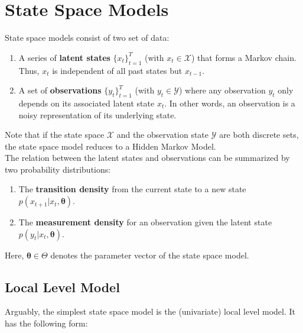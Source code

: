 \documentclass[11pt, oneside]{scrreprt}   	%
\begin{document}
\chapter{State Space Models}
\label{chp:models}
State space models consist of two set of data:
\begin{enumerate}
	\item A series of \textbf{latent states} $\{x_t\}_{t=1}^T$ (with $x_t \in \mathcal{X}$) that forms a Markov chain. Thus, $x_t$ is independent of all past states but $x_{t-1}$.
	\item A set of \textbf{observations} $\{y_t\}_{t=1}^T$ (with $y_t \in \mathcal{Y}$) where any observation $y_t$ only depends on its associated latent state $x_t$. In other words, an observation is a noisy representation of its underlying state.
\end{enumerate}
Note that if the state space $\mathcal{X}$ and the observation state $\mathcal{Y}$ are both discrete sets, the state space model reduces to a Hidden Markov Model.\\

The relation between the latent states and observations can be summarized by two probability distributions:
\begin{enumerate}
	\item The \textbf{transition density} from the current state to a new state $p(x_{t+1} | x_t, \boldsymbol{\theta})$.
	\item The \textbf{measurement density} for an observation given the latent state $p(y_t | x_t, \boldsymbol{\theta})$.
\end{enumerate}
Here, $\boldsymbol{\theta} \in \Theta$ denotes the parameter vector of the state space model. 


\section{Local Level Model}
Arguably, the simplest state space model is the (univariate) local level model. It has the following form:
\end{document}
